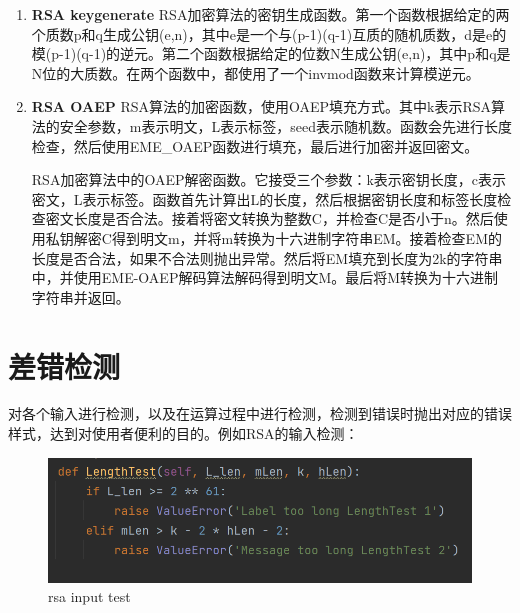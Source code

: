 \documentclass{article}
\begin{document}
\begin{sloppypar}
\begin{enumerate}
		\item \textbf{RSA keygenerate}
		 RSA加密算法的密钥生成函数。第一个函数根据给定的两个质数p和q生成公钥(e,n)，其中e是一个与(p-1)(q-1)互质的随机质数，d是e的模(p-1)(q-1)的逆元。第二个函数根据给定的位数N生成公钥(e,n)，其中p和q是N位的大质数。在两个函数中，都使用了一个invmod函数来计算模逆元。
		
		\item \textbf{RSA OAEP}
		 RSA算法的加密函数，使用OAEP填充方式。其中k表示RSA算法的安全参数，m表示明文，L表示标签，seed表示随机数。函数会先进行长度检查，然后使用EME\_OAEP函数进行填充，最后进行加密并返回密文。
		
		​ RSA加密算法中的OAEP解密函数。它接受三个参数：k表示密钥长度，c表示密文，L表示标签。函数首先计算出L的长度，然后根据密钥长度和标签长度检查密文长度是否合法。接着将密文转换为整数C，并检查C是否小于n。然后使用私钥解密C得到明文m，并将m转换为十六进制字符串EM。接着检查EM的长度是否合法，如果不合法则抛出异常。然后将EM填充到长度为2k的字符串中，并使用EME-OAEP解码算法解码得到明文M。最后将M转换为十六进制字符串并返回。
	\end{enumerate}
	\section{差错检测}
	对各个输入进行检测，以及在运算过程中进行检测，检测到错误时抛出对应的错误样式，达到对使用者便利的目的。例如RSA的输入检测：
	\begin{figure}[H]
		\centering
		\includegraphics[scale=0.9]{pic/rsa length test.png}
		\caption{rsa input test}
		\label{figure}
		
	\end{figure}


\end{sloppypar}
\end{document}

